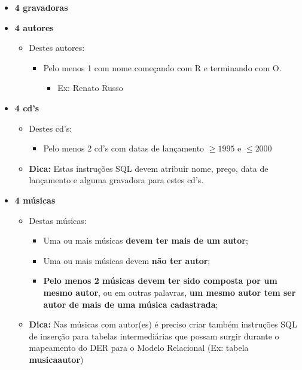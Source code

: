 \documentclass[12pt]{exam}
\begin{document}
\begin{questions}
\begin{itemize}
    \item \textbf{4 gravadoras}
    \item \textbf{4 autores}
    \begin{itemize}
        \item Destes autores:
        \begin{itemize}
            \item Pelo menos 1 com nome começando com R e terminando com O. 
            \begin{itemize}
                \item Ex: Renato Russo
            \end{itemize}
        \end{itemize}
    \end{itemize}
    \item \textbf{4 cd's}
    \begin{itemize}
        \item Destes cd's:
        \begin{itemize}
            \item Pelo menos 2 cd's com datas de lançamento $\geq 1995$ e $\leq 2000$
        \end{itemize}
         \item \textbf{Dica:} Estas instruções SQL devem atribuir nome, preço, data de lançamento e alguma gravadora para estes cd's.
    \end{itemize}
    \item \textbf{4 músicas}
        \begin{itemize}
            \item Destas músicas:
            \begin{itemize}
                \item Uma ou mais músicas \textbf{devem ter mais de um autor};
                \item Uma ou mais músicas devem \textbf{não ter autor};
                \item \textbf{Pelo menos 2 músicas devem ter sido composta por um mesmo autor}, ou em outras palavras, \textbf{um mesmo autor tem ser autor de mais de uma música cadastrada};
            \end{itemize}
            \item \textbf{Dica:} Nas músicas com autor(es) é preciso criar também instruções SQL de inserção para tabelas intermediárias que possam surgir durante o mapeamento do DER para o Modelo Relacional (Ex: tabela \textbf{musica\underline{\hspace{0.3cm}}autor})
        \end{itemize}
\end{itemize}


\end{questions}
\end{document}
